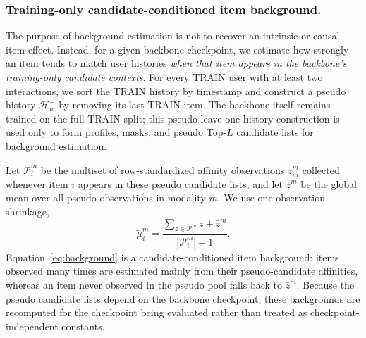 \documentclass[sigconf,anonymous,review]{acmart}
\begin{document}
\subsubsection{Training-only candidate-conditioned item background.}
The purpose of background estimation is not to recover an intrinsic or causal item effect.
Instead, for a given backbone checkpoint, we estimate how strongly an item tends to match user histories \emph{when that item appears in the backbone's training-only candidate contexts}.
For every TRAIN user with at least two interactions, we sort the TRAIN history by timestamp and construct a pseudo history $\mathcal{H}^{-}_u$ by removing its last TRAIN item.
The backbone itself remains trained on the full TRAIN split; this pseudo leave-one-history construction is used only to form profiles, masks, and pseudo Top-$L$ candidate lists for background estimation.

Let $\mathcal{P}_i^m$ be the multiset of row-standardized affinity observations $z_{ui}^m$ collected whenever item $i$ appears in these pseudo candidate lists, and let $\bar z^m$ be the global mean over all pseudo observations in modality $m$.
We use one-observation shrinkage,
\begin{equation}
    \widetilde{\mu}_i^m
    =
    \frac{
        \sum_{z\in\mathcal{P}_i^m} z + \bar z^m
    }{
        |\mathcal{P}_i^m|+1
    }.
    \label{eq:background}
\end{equation}
Equation~\eqref{eq:background} is a candidate-conditioned item background: items observed many times are estimated mainly from their pseudo-candidate affinities, whereas an item never observed in the pseudo pool falls back to $\bar z^m$.
Because the pseudo candidate lists depend on the backbone checkpoint, these backgrounds are recomputed for the checkpoint being evaluated rather than treated as checkpoint-independent constants.
\end{document}
